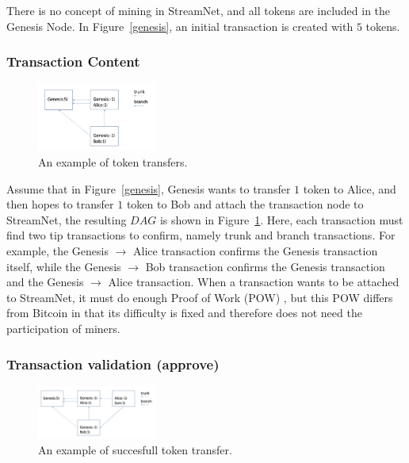 There is no concept of mining in StreamNet, and all tokens are included in the Genesis Node.
In Figure~\ref{genesis}, an initial transaction is created with $5$ tokens.


\subsubsection{Transaction Content}

\begin{figure}[!ht]
\begin{center}
\includegraphics[width=0.35\textwidth]{figures/simple_transfer.png}
    \caption{
        An example of token transfers.
     }
\label{simple_transfer}
\end{center}
\end{figure}

Assume that in Figure~\ref{genesis}, Genesis wants to transfer $1$ token to Alice, 
and then hopes to transfer $1$ token to Bob and attach the transaction node to StreamNet, the resulting $DAG$ is shown in Figure~\ref{simple_transfer}.
Here, each transaction must find two tip transactions to confirm, namely trunk and branch transactions.
For example, the Genesis $\rightarrow$ Alice transaction confirms the Genesis transaction itself,
while the Genesis $\rightarrow$ Bob transaction confirms the Genesis transaction and the Genesis $\rightarrow$ Alice transaction.
When a transaction wants to be attached to StreamNet, it must do enough Proof of Work (POW) \cite{pow_tangle},
but this POW differs from Bitcoin in that its difficulty is fixed and therefore does not need the participation of miners.

\subsubsection{Transaction validation (approve)}

\begin{figure}[!ht]
\begin{center}
\includegraphics[width=0.35\textwidth]{figures/txn_success.png}
    \caption{
        An example of succesfull token transfer.
     }
\label{txn_success}
\end{center}
\end{figure}

